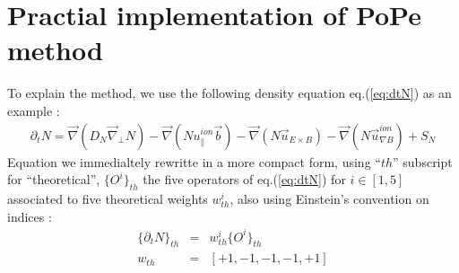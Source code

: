 \documentclass[12pt,a4paper]{paper}
\newcommand{\acc}[2]{ \{ #1 \}_{#2} }
\begin{document}
\section[Practial implementation of PoPe method]{Practial implementation of PoPe method}
%
To explain the method, we use the following density equation eq.(\ref{eq:dtN}) as an example :
%
\begin{eqnarray}
  \label{eq:dtN}
  \partial_t N =
  \vec{\nabla} (D_N \vec{\nabla}_\perp N)
-  \vec{\nabla} ( N u^{ion}_\parallel \vec{b}) 
-  \vec{\nabla} ( N \vec{u}_{E \times B})
-  \vec{\nabla} ( N \vec{u}^{ion}_{\nabla B})
+  S_N
\end{eqnarray}
%
Equation we immedialtely rewritte in a more compact form, using ``$th$'' subscript for ``theoretical'', $\acc{O^i}{th}$ the five operators of eq.(\ref{eq:dtN}) for $i\in[1,5]$ associated to five theoretical weights $w^i_{th}$, also using Einstein's convention on indices :
%
\begin{eqnarray}
  \acc{\partial_t N}{th} &=& w^i_{th} \acc{O^i}{th} \label{eq:dtN_th}\\
  w_{th} &=& [+1,-1,-1,-1,+1] \label{eq:w_th}
\end{eqnarray}
\end{document}
